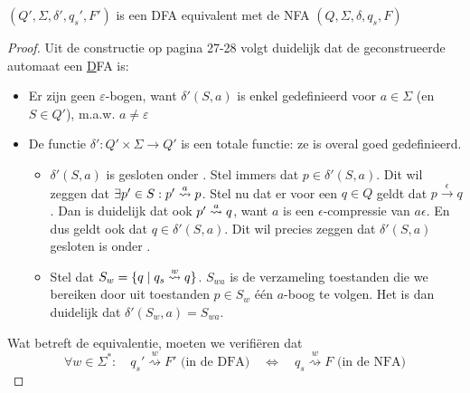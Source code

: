 \documentclass[../aanvullingen_cursus.tex]{subfiles}
\begin{document}
\begin{stelling}
	\( (Q',\Sigma, \delta', q_s',F') \) is een DFA equivalent met de NFA \((Q,\Sigma,\delta,q_s,F)\)
\end{stelling}

\begin{proof}
	Uit de constructie op pagina 27-28 volgt duidelijk dat de geconstrueerde automaat een \underline{D}FA is:
	\begin{itemize}
		\item Er zijn geen \( \varepsilon \)-bogen, want \( \delta'(S,a) \) is enkel gedefinieerd voor \( a \in \Sigma \) (en \( S\in Q' \)), m.a.w. \( a\neq \varepsilon \)
		\item De functie \( \delta':Q' \times \Sigma \to Q' \) is een totale functie: ze is overal goed gedefinieerd.
		\begin{itemize}
			\item \(\delta'(S,a)\) is gesloten onder \epsilonbogen. Stel immers dat \(p \in \delta'(S,a)\). Dit wil zeggen dat \(\exists p' \in S : p'\overset{a}{\rightsquigarrow}p\). Stel nu dat er voor een \(q\in Q\) geldt dat \(p\overset{\epsilon}{\rightarrow}q\). Dan is duidelijk dat ook \(p'\overset{a}{\rightsquigarrow}q\), want \(a\) is een \(\epsilon\)-compressie van \(a\epsilon\). En dus geldt ook dat \(q \in \delta'(S,a)\). Dit wil precies zeggen dat \(\delta'(S,a)\) gesloten is onder \epsilonbogen.
			\item Stel dat \(S_w=\{q \mid q_s \overset{w}{\rightsquigarrow} q\}\). \(S_{wa}\) is de verzameling toestanden die we bereiken door uit toestanden \(p \in S_w\) één \(a\)-boog te volgen. Het is dan duidelijk dat  \(\delta'(S_w,a)=S_{wa}\).
		\end{itemize}
	\end{itemize}

	Wat betreft de equivalentie, moeten we verifiëren dat \[ \forall w \in \Sigma^*: \quad q_s' \overset{w}{\rightsquigarrow} F'  \text{ (in de DFA)} \quad \Longleftrightarrow \quad q_s \overset{w}{\rightsquigarrow} F \text{ (in de NFA)}\]


\end{proof}
\end{document}
